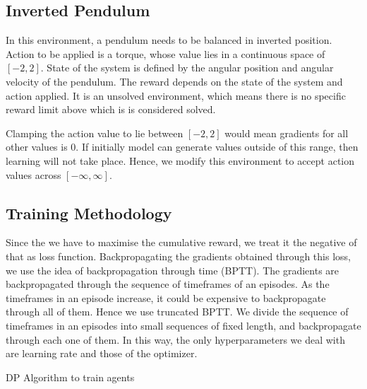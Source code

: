 \documentclass{juliacon}
\begin{document}
\subsection{Inverted Pendulum}
\label{sec:pendulum}
In this environment, a pendulum needs to be balanced in inverted position. Action to be applied is a torque, whose value lies in a continuous space of $[-2, 2]$. State of the system is defined by the angular position and angular velocity of the pendulum. The reward depends on the state of the system and action applied. It is an unsolved environment, which means there is no specific reward limit above which is is considered solved.\cite{1606.01540}

Clamping the action value to lie between $[-2, 2]$ would mean gradients for all other values is 0. If initially model can generate values outside of this range, then learning will not take place. Hence, we modify this environment to accept action values across $[-\infty, \infty]$.
\subsection{Training Methodology}
\label{sec:training}
Since the we have to maximise the cumulative reward, we treat it the negative of that as loss function. Backpropagating the gradients obtained through this loss, we use the idea of backpropagation through time (BPTT). The gradients are backpropagated through the sequence of timeframes of an episodes. As the timeframes in an episode increase, it could be expensive to backpropagate through all of them. Hence we use truncated BPTT. We divide the sequence of timeframes in an episodes into small sequences of fixed length, and backpropagate through each one of them. In this way, the only hyperparameters we deal with are learning rate and those of the optimizer.


\begin{algorithm}[!htb]
    \caption{DP Algorithm to train agents}
    \label{alg:DiffRL}
    \SetAlgoLined
    \
\end{algorithm}
\end{document}
